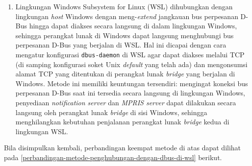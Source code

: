 \begin{enumerate}
    \item Lingkungan Windows Subsystem for Linux (WSL) dihubungkan dengan lingkungan \textit{host} Windows dengan meng-\textit{extend} jangkauan bus perpesanan D-Bus hingga dapat diakses secara langsung di dalam lingkungan Windows, sehingga perangkat lunak di Windows dapat langsung menghubungi bus perpesanan D-Bus yang berjalan di WSL. Hal ini dicapai dengan cara mengatur konfigurasi \verb|dbus-daemon| di WSL agar dapat diakses melalui TCP (di samping konfigurasi soket Unix \textit{default} yang telah ada) dan mengonsumsi alamat TCP yang ditentukan di perangkat lunak \textit{bridge} yang berjalan di Windows. Metode ini memiliki keuntungan tersendiri: mengingat koneksi bus perpesanan D-Bus saat ini tersedia secara langsung di lingkungan Windows, penyediaan \textit{notification server} dan \textit{MPRIS server} dapat dilakukan secara langsung oleh perangkat lunak \textit{bridge} di sisi Windows, sehingga menghilangkan kebutuhan penjalanan perangkat lunak \textit{bridge} kedua di lingkungan WSL.
\end{enumerate}

Bila disimpulkan kembali, perbandingan keempat metode di atas dapat dilihat pada \autoref{perbandingan-metode-penghubungan-dengan-dbus-di-wsl} berikut.

